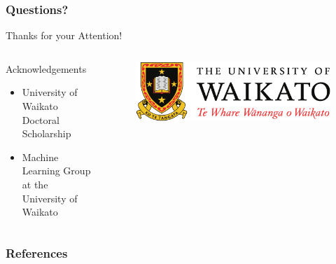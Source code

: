 \documentclass[handout]{beamer}
\begin{document}
\begin{frame}
\frametitle{Questions?}
\begin{center}\LARGE Thanks for your Attention!\\  \end{center}

\begin{columns}
\begin{column}{0.55\textwidth}
\begin{block}{Acknowledgements}
\begin{itemize}\tiny
	\item University of Waikato Doctoral Scholarship
	\item Machine Learning Group at the University of Waikato
	
\end{itemize}
\end{block}
\end{column}
\begin{column}{0.45\textwidth}
\vspace{1.5cm}

\begin{figure}[h!]
	\centering
	\includegraphics[scale=0.3]{pics/logo.pdf}
\end{figure}
\end{column}
\end{columns}

\end{frame}

\begin{frame}[allowframebreaks]\scriptsize
\frametitle{References}


%
\end{frame}  


\end{document}
